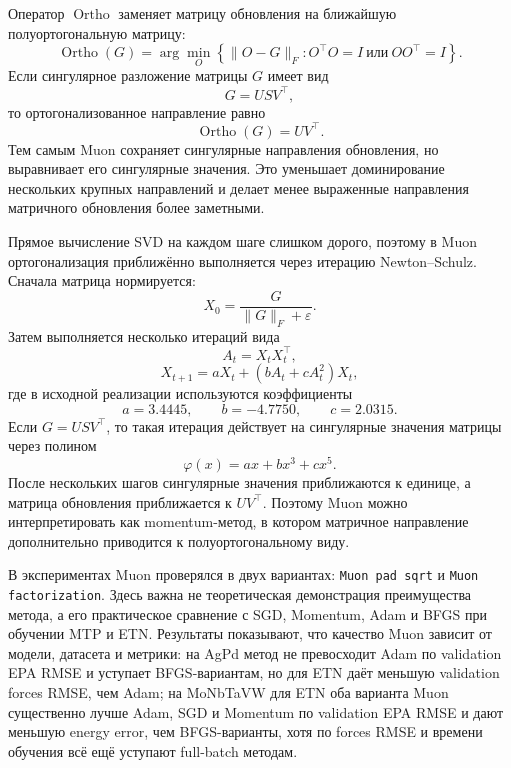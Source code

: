 Оператор \(\operatorname{Ortho}\) заменяет матрицу обновления на ближайшую полуортогональную матрицу:
\begin{equation}
    \operatorname{Ortho}(G)
    =
    \arg\min_{O}
    \left\{
        \|O-G\|_F:
        O^\top O=I
        \ \text{или}\
        OO^\top=I
    \right\}.
\end{equation}
Если сингулярное разложение матрицы \(G\) имеет вид
\begin{equation}
    G
    =
    U S V^\top,
\end{equation}
то ортогонализованное направление равно
\begin{equation}
    \operatorname{Ortho}(G)
    =
    U V^\top.
\end{equation}
Тем самым Muon сохраняет сингулярные направления обновления, но выравнивает его сингулярные значения. Это уменьшает доминирование нескольких крупных направлений и делает менее выраженные направления матричного обновления более заметными.

Прямое вычисление SVD на каждом шаге слишком дорого, поэтому в Muon ортогонализация приближённо выполняется через итерацию Newton--Schulz. Сначала матрица нормируется:
\begin{equation}
    X_0
    =
    \frac{G}{\|G\|_F+\varepsilon}.
\end{equation}
Затем выполняется несколько итераций вида
\begin{equation}
    A_t
    =
    X_t X_t^\top,
\end{equation}
\begin{equation}
    X_{t+1}
    =
    aX_t
    +
    \left(
        bA_t
        +
        cA_t^2
    \right)
    X_t,
\end{equation}
где в исходной реализации используются коэффициенты
\begin{equation}
    a=3.4445,
    \qquad
    b=-4.7750,
    \qquad
    c=2.0315.
\end{equation}
Если \(G=USV^\top\), то такая итерация действует на сингулярные значения матрицы через полином
\begin{equation}
    \varphi(x)
    =
    ax
    +
    bx^3
    +
    cx^5.
\end{equation}
После нескольких шагов сингулярные значения приближаются к единице, а матрица обновления приближается к \(UV^\top\). Поэтому Muon можно интерпретировать как momentum-метод, в котором матричное направление дополнительно приводится к полуортогональному виду.

В экспериментах Muon проверялся в двух вариантах: \texttt{Muon pad sqrt} и \texttt{Muon factorization}. Здесь важна не теоретическая демонстрация преимущества метода, а его практическое сравнение с SGD, Momentum, Adam и BFGS при обучении MTP и ETN. Результаты показывают, что качество Muon зависит от модели, датасета и метрики: на AgPd метод не превосходит Adam по validation EPA RMSE и уступает BFGS-вариантам, но для ETN даёт меньшую validation forces RMSE, чем Adam; на MoNbTaVW для ETN оба варианта Muon существенно лучше Adam, SGD и Momentum по validation EPA RMSE и дают меньшую energy error, чем BFGS-варианты, хотя по forces RMSE и времени обучения всё ещё уступают full-batch методам.
